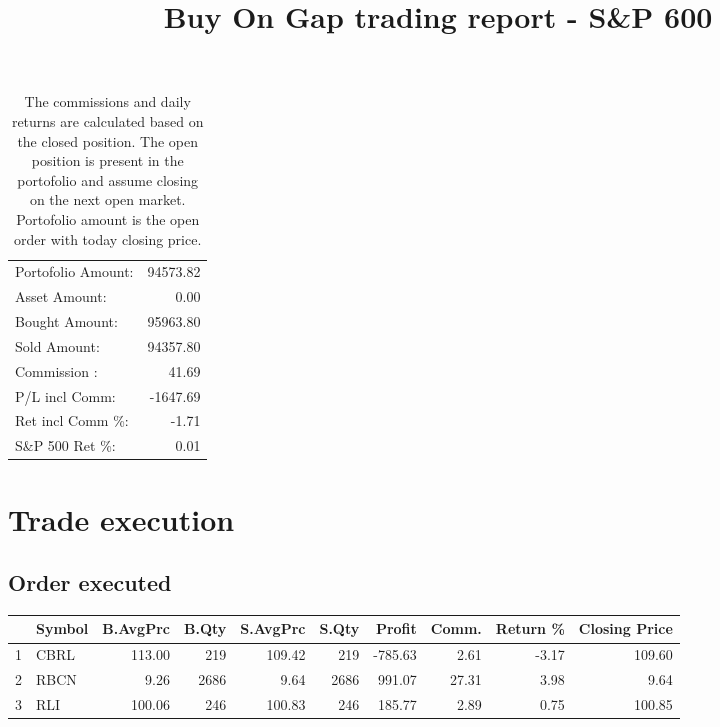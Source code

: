 \documentclass{tufte-handout}\usepackage[]{graphicx}\usepackage[]{color}
\begin{document}
\begin{table}[ht]
\begin{tabular}{lr}
   \hline
Portofolio Amount: & 94573.82 \\ 
  Asset Amount: & 0.00 \\ 
  Bought Amount: & 95963.80 \\ 
  Sold   Amount: & 94357.80 \\ 
  Commission   : & 41.69 \\ 
  P/L incl Comm: & -1647.69 \\ 
  Ret incl Comm \%: & -1.71 \\ 
  S\&P 500 Ret \%: & 0.01 \\ 
   \hline
\end{tabular}
\caption{The commissions and daily returns are calculated based on the closed position.
The open position is present in the portofolio and assume closing on the next open market.
Portofolio amount is the open order with today closing price.} 
\end{table}



% 
% 


\title{Buy On Gap trading report - S\&P 600}
\maketitle

\section{Trade execution}
\subsection{Order executed}


\begin{table}[ht]
\centering
\begin{tabular}{llrrrrrrr|r}
  \hline
 & Symbol & B.AvgPrc & B.Qty & S.AvgPrc & S.Qty & Profit & Comm. & Return \% & Closing Price \\ 
  \hline
1 & CBRL & 113.00 & 219 & 109.42 & 219 & -785.63 & 2.61 & -3.17 & 109.60 \\ 
  2 & RBCN & 9.26 & 2686 & 9.64 & 2686 & 991.07 & 27.31 & 3.98 & 9.64 \\ 
  3 & RLI & 100.06 & 246 & 100.83 & 246 & 185.77 & 2.89 & 0.75 & 100.85 \\ 
   \hline
\end{tabular}
\end{table}
\end{document}
